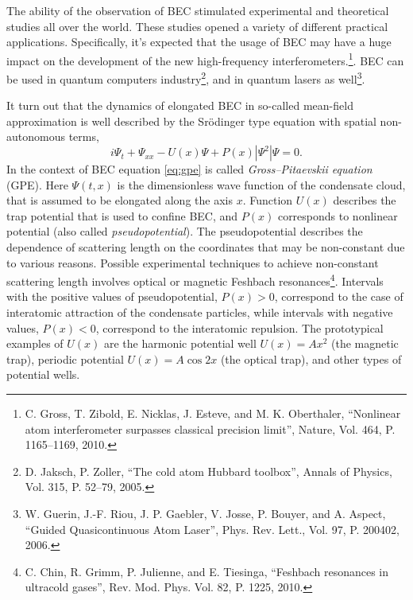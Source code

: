 \documentclass[candidate, href, colorlinks]{disser}
\begin{document}
The ability of the observation of BEC stimulated experimental and theoretical studies all over the world.
These studies opened a variety of different practical applications.
Specifically, it's expected that the usage of BEC may have a huge impact on the development of the new high-frequency interferometers.\footnote{C. Gross, T. Zibold, E. Nicklas, J. Esteve, and M. K. Oberthaler, ``Nonlinear atom interferometer surpasses classical precision limit'', Nature, Vol. 464, P. 1165--1169, 2010.}.
BEC can be used in quantum computers industry\footnote{D. Jaksch, P. Zoller, ``The cold atom Hubbard toolbox'', Annals of Physics, Vol. 315, P. 52--79, 2005.}, and in quantum lasers as well\footnote{W. Guerin, J.-F. Riou, J. P. Gaebler, V. Josse, P. Bouyer, and A. Aspect, ``Guided Quasicontinuous Atom Laser'', Phys. Rev. Lett., Vol. 97, P. 200402, 2006.}.

It turn out that the dynamics of elongated BEC in so-called mean-field approximation is well described by the Sr\"odinger type equation with spatial non-autonomous terms,
\begin{equation}
	i \Psi_t + \Psi_{xx} - U(x) \Psi + P(x) |\Psi^2| \Psi = 0.
\label{eq:gpe}
\end{equation}
In the context of BEC equation \eqref{eq:gpe} is called {\it Gross--Pitaevskii equation} (GPE).
Here $\Psi(t, x)$ is the dimensionless wave function of the condensate cloud, that is assumed to be elongated along the axis $x$.
Function $U(x)$ describes the trap potential that is used to confine BEC, and $P(x)$ corresponds to nonlinear potential (also called {\it pseudopotential}).
The pseudopotential describes the dependence of scattering length on the coordinates that may be non-constant due to various reasons.
Possible experimental techniques to achieve non-constant scattering length involves optical or magnetic Feshbach resonances\footnote{C. Chin, R. Grimm, P. Julienne, and E. Tiesinga, ``Feshbach resonances in ultracold gases'', Rev. Mod. Phys. Vol. 82, P. 1225, 2010.}.
Intervals with the positive values of pseudopotential, $P(x) > 0$, correspond to the case of interatomic attraction of the condensate particles, while intervals with negative values, $P(x) < 0$, correspond to the interatomic repulsion.
The prototypical examples of $U(x)$ are the harmonic potential well $U(x) = Ax^2$ (the magnetic trap), periodic potential $U(x) = A \cos 2x$ (the optical trap), and other types of potential wells.
\end{document}
